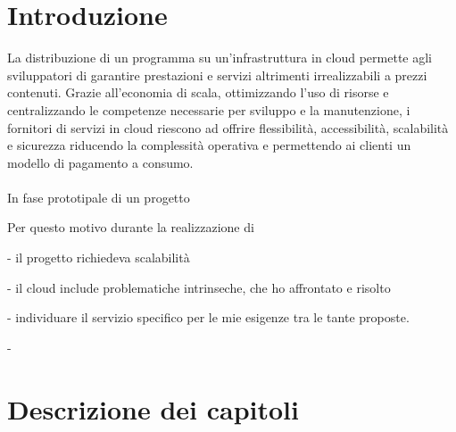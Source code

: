 \section*{Introduzione}

La distribuzione di un programma su un'infrastruttura in cloud permette agli sviluppatori di 
garantire prestazioni e servizi altrimenti irrealizzabili a prezzi contenuti.
Grazie all'economia di scala, ottimizzando l'uso di risorse e 
centralizzando le competenze necessarie per sviluppo e la manutenzione, 
i fornitori di servizi in cloud riescono ad offrire flessibilità, accessibilità, scalabilità e sicurezza 
riducendo la complessità operativa e permettendo ai clienti un modello di pagamento a consumo.\\
\\
In fase prototipale di un progetto

Per questo motivo durante la realizzazione di 


- il progetto richiedeva scalabilità

- il cloud include problematiche intrinseche, che ho affrontato e risolto

- individuare il servizio specifico per le mie esigenze tra le tante proposte.

- 


\clearpage

\section*{Descrizione dei capitoli}
